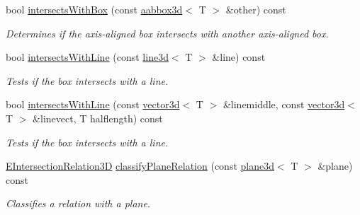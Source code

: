 \begin{DoxyCompactItemize}
bool \hyperlink{classirr_1_1core_1_1aabbox3d_a7210d8759855896ba4919a800ad69bbc}{intersects\+With\+Box} (const \hyperlink{classirr_1_1core_1_1aabbox3d}{aabbox3d}$<$ T $>$ \&other) const
\begin{DoxyCompactList}\small\item\em Determines if the axis-\/aligned box intersects with another axis-\/aligned box. \end{DoxyCompactList}\item 
bool \hyperlink{classirr_1_1core_1_1aabbox3d_ad0d7fec0145329dfca538066298fa3f2}{intersects\+With\+Line} (const \hyperlink{classirr_1_1core_1_1line3d}{line3d}$<$ T $>$ \&line) const
\begin{DoxyCompactList}\small\item\em Tests if the box intersects with a line. \end{DoxyCompactList}\item 
bool \hyperlink{classirr_1_1core_1_1aabbox3d_ad24417ef24e598bc484ea8b7af1c2187}{intersects\+With\+Line} (const \hyperlink{classirr_1_1core_1_1vector3d}{vector3d}$<$ T $>$ \&linemiddle, const \hyperlink{classirr_1_1core_1_1vector3d}{vector3d}$<$ T $>$ \&linevect, T halflength) const
\begin{DoxyCompactList}\small\item\em Tests if the box intersects with a line. \end{DoxyCompactList}\item 
\hyperlink{namespaceirr_1_1core_a8a9999eb0d151083f48afe5f7d17a96c}{E\+Intersection\+Relation3D} \hyperlink{classirr_1_1core_1_1aabbox3d_aa2a6c5613392e34552a31fe7b46286b1}{classify\+Plane\+Relation} (const \hyperlink{classirr_1_1core_1_1plane3d}{plane3d}$<$ T $>$ \&plane) const
\begin{DoxyCompactList}\small\item\em Classifies a relation with a plane. \end{DoxyCompactList}\end{DoxyCompactItemize}
